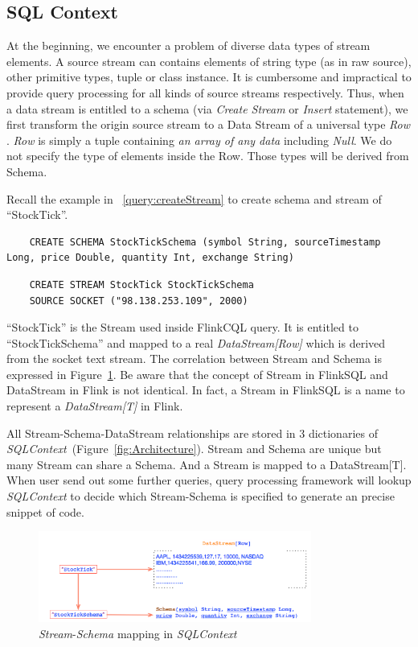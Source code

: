 \subsection{SQL Context} 

At the beginning, we encounter a problem of diverse data types of stream elements. A source stream can contains elements of string type (as in raw source), other primitive types, tuple or class instance. It is cumbersome and impractical to provide query processing for all kinds of source streams respectively. Thus, when a data stream is entitled to a schema (via \textit{Create Stream} or \textit{Insert} statement), we first transform the origin source stream to a Data Stream of a universal type \textit{Row} . \textit{Row} is simply a tuple containing \textit{an array of any data} including \textit{Null}. We do not specify the type of elements inside the Row. Those types will be derived from Schema.

Recall the example in ~\ref{query:createStream} to create schema and stream of ``StockTick''.
\begin{lstlisting}
	CREATE SCHEMA StockTickSchema (symbol String, sourceTimestamp Long, price Double, quantity Int, exchange String)
\end{lstlisting}

\begin{lstlisting} 
	CREATE STREAM StockTick StockTickSchema 
	SOURCE SOCKET ("98.138.253.109", 2000)
\end{lstlisting}

``StockTick'' is the Stream used inside FlinkCQL query. It is entitled to ``StockTickSchema'' and mapped to a real \textit{DataStream[Row]} which is derived from the socket text stream. The correlation between Stream and Schema is expressed in Figure~\ref{fig:SQLContext}. Be aware that the concept of Stream in FlinkSQL and DataStream in Flink is not identical. In fact, a Stream in FlinkSQL is a name to represent a \textit{DataStream[T]} in Flink.

All Stream-Schema-DataStream relationships are stored in 3 dictionaries of \textit{SQLContext}~(Figure~\ref{fig:Architecture}). 
Stream and Schema are unique but many Stream can share a Schema. And a Stream is mapped to a DataStream[T]. When user send out some further queries, query processing framework will lookup \textit{SQLContext} to decide which Stream-Schema is specified to generate an precise snippet of code.

\begin{figure}[h!] 
\centering    
\includegraphics[width=0.8\textwidth]{SQLContext}
\caption{\textit{Stream}-\textit{Schema} mapping in \textit{SQLContext}}
\label{fig:SQLContext}
\end{figure}

